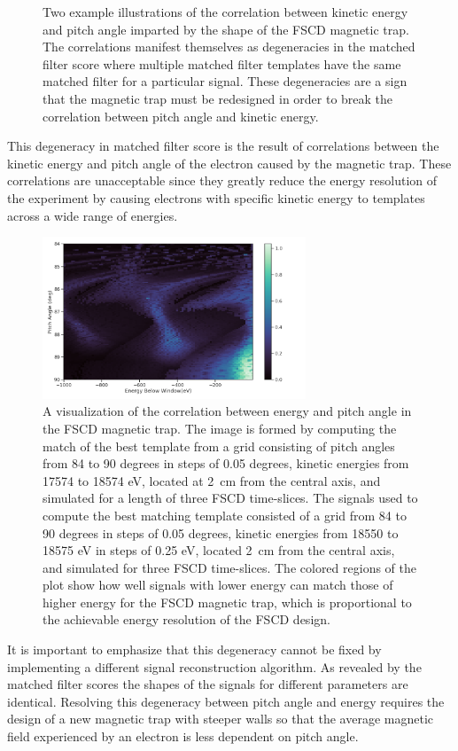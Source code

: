 \begin{figure}[htbp]
\begin{subfigure}{0.49\textwidth}
        \caption{}
    \end{subfigure}
    \caption{Two example illustrations of the correlation between kinetic energy and pitch angle imparted by the shape of the FSCD magnetic trap. The correlations manifest themselves as degeneracies in the matched filter score where multiple matched filter templates have the same matched filter for a particular signal. These degeneracies are a sign that the magnetic trap must be redesigned in order to break the correlation between pitch angle and kinetic energy. }
    \label{fig:chap4-mf-degeneracy}
\end{figure}

This degeneracy in matched filter score is the result of correlations between the kinetic energy and pitch angle of the electron caused by the magnetic trap. These correlations are unacceptable since they greatly reduce the energy resolution of the experiment by causing electrons with specific kinetic energy to templates across a wide range of energies.
\begin{figure}[htbp]
    \centering
    \includegraphics[width=0.7\textwidth]{figs/Chapter-4/230517_energy_pitch_correlation_map.png}
    \caption{A visualization of the correlation between energy and pitch angle in the FSCD magnetic trap. The image is formed by computing the match of the best template from a grid consisting of pitch angles from 84 to 90 degrees in steps of 0.05 degrees, kinetic energies from 17574 to 18574 eV, located at 2~cm from the central axis, and simulated for a length of three FSCD time-slices. The signals used to compute the best matching template consisted of a grid from 84 to 90 degrees in steps of 0.05 degrees, kinetic energies from 18550 to 18575 eV in steps of 0.25 eV, located 2~cm from the central axis, and simulated for three FSCD time-slices. The colored regions of the plot show how well signals with lower energy can match those of higher energy for the FSCD magnetic trap, which is proportional to the achievable energy resolution of the FSCD design.}
    \label{fig:chap4-mf-degeneracy-large-scale}
\end{figure}
It is important to emphasize that this degeneracy cannot be fixed by implementing a different signal reconstruction algorithm. As revealed by the matched filter scores the shapes of the signals for different parameters are identical. Resolving this degeneracy between pitch angle and energy requires the design of a new magnetic trap with steeper walls so that the average magnetic field experienced by an electron is less dependent on pitch angle.

